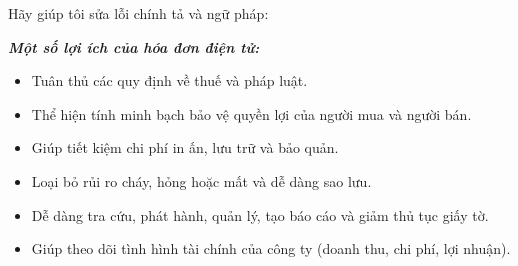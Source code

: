 Hãy giúp tôi sửa lỗi chính tả và ngữ pháp:

\textbf{\textit{Một số lợi ích của hóa đơn điện tử:}}

\begin{itemize}

\item Tuân thủ các quy định về thuế và pháp luật.

\item Thể hiện tính minh bạch bảo vệ quyền lợi của người mua và người bán.

\item Giúp tiết kiệm chi phí in ấn, lưu trữ và bảo quản.

\item Loại bỏ rủi ro cháy, hỏng hoặc mất và dễ dàng sao lưu.

\item Dễ dàng tra cứu, phát hành, quản lý, tạo báo cáo và giảm thủ tục giấy tờ.

\item Giúp theo dõi tình hình tài chính của công ty (doanh thu, chi phí, lợi nhuận).

\end{itemize}

